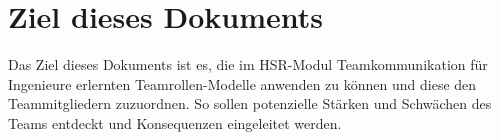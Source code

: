 
\chapter{Ziel dieses Dokuments}

Das Ziel dieses Dokuments ist es, die im HSR-Modul Teamkommunikation für Ingenieure erlernten Teamrollen-Modelle anwenden zu können und diese den Teammitgliedern zuzuordnen. So sollen potenzielle Stärken und Schwächen des Teams entdeckt und Konsequenzen eingeleitet werden. 
